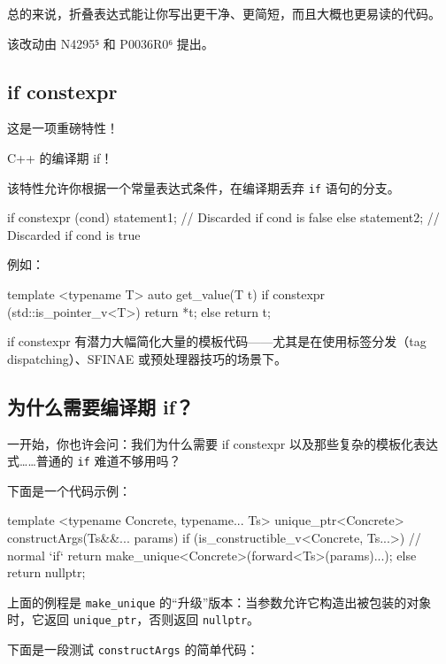 总的来说，折叠表达式能让你写出更干净、更简短，而且大概也更易读的代码。

\begin{myInfoBox}
该改动由 N4295⁵ 和 P0036R0⁶ 提出。
\end{myInfoBox}

\subsection{if constexpr}

这是一项重磅特性！

C++ 的编译期 if！

该特性允许你根据一个常量表达式条件，在编译期丢弃 \texttt{if} 语句的分支。

\begin{codebox}[cpp]
if constexpr (cond)
statement1; // Discarded if cond is false
else
statement2; // Discarded if cond is true
\end{codebox}

例如：

\begin{codebox}[cpp]
template <typename T>
auto get_value(T t)
{
if constexpr (std::is_pointer_v<T>)
return *t;
else
return t;
}
\end{codebox}

if constexpr 有潜力大幅简化大量的模板代码——尤其是在使用标签分发（tag dispatching）、SFINAE 或预处理器技巧的场景下。

\subsection{为什么需要编译期 if？}

一开始，你也许会问：我们为什么需要 if constexpr 以及那些复杂的模板化表达式……普通的 \texttt{if} 难道不够用吗？

下面是一个代码示例：

\begin{codebox}[cpp]
template <typename Concrete, typename... Ts>
unique_ptr<Concrete> constructArgs(Ts&&... params)
{
if (is_constructible_v<Concrete, Ts...>) // normal `if`
return make_unique<Concrete>(forward<Ts>(params)...);
else
return nullptr;
}
\end{codebox}

上面的例程是 \texttt{make\_unique} 的“升级”版本：当参数允许它构造出被包装的对象时，它返回 \texttt{unique\_ptr}，否则返回 \texttt{nullptr}。

下面是一段测试 \texttt{constructArgs} 的简单代码：

